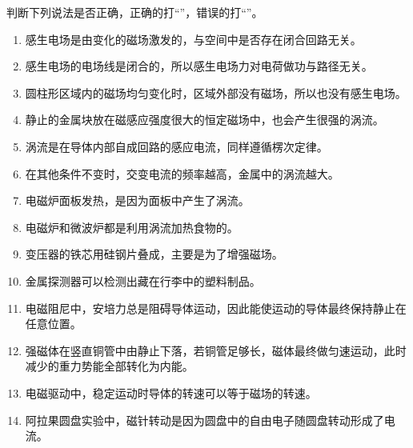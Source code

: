 \noindent 判断下列说法是否正确，正确的打“\dui”，错误的打“\cuo”。
\begin{enumerate}[label=（\arabic*）,leftmargin=2.6em,itemsep=2pt]
  \item 感生电场是由变化的磁场激发的，与空间中是否存在闭合回路无关。
  \item 感生电场的电场线是闭合的，所以感生电场力对电荷做功与路径无关。
  \item 圆柱形区域内的磁场均匀变化时，区域外部没有磁场，所以也没有感生电场。
  \item 静止的金属块放在磁感应强度很大的恒定磁场中，也会产生很强的涡流。
  \item 涡流是在导体内部自成回路的感应电流，同样遵循楞次定律。
  \item 在其他条件不变时，交变电流的频率越高，金属中的涡流越大。
  \item 电磁炉面板发热，是因为面板中产生了涡流。
  \item 电磁炉和微波炉都是利用涡流加热食物的。
  \item 变压器的铁芯用硅钢片叠成，主要是为了增强磁场。
  \item 金属探测器可以检测出藏在行李中的塑料制品。
  \item 电磁阻尼中，安培力总是阻碍导体运动，因此能使运动的导体最终保持静止在任意位置。
  \item 强磁体在竖直铜管中由静止下落，若铜管足够长，磁体最终做匀速运动，此时减少的重力势能全部转化为内能。
  \item 电磁驱动中，稳定运动时导体的转速可以等于磁场的转速。
  \item 阿拉果圆盘实验中，磁针转动是因为圆盘中的自由电子随圆盘转动形成了电流。
\end{enumerate}
